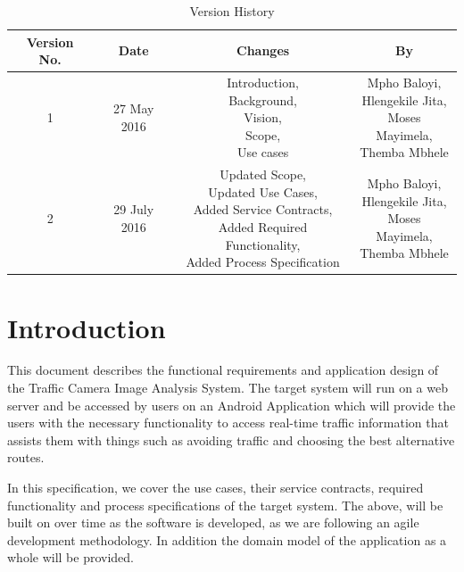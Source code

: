 \documentclass[a4paper,12pt]{article}
\begin{document}
\newpage
\tableofcontents
\newpage

\newpage
\begin{table}[ht]
 \centering
 \caption{Version History}
 \label{tab:table1}
 \begin{tabular}{cccc}
   \toprule Version No. & Date & Changes & By\\
   \midrule 1 & 27 May 2016 & \makecell {Introduction,\\ Background,\\ Vision,\\ Scope,\\ Use cases} & \makecell {Mpho Baloyi,\\ Hlengekile Jita,\\ Moses Mayimela,\\ Themba Mbhele}\\
   2 & 29 July 2016 & \makecell {Updated Scope,\\ Updated Use Cases,\\ Added Service Contracts,\\ Added Required Functionality,\\ Added Process Specification} & \makecell {Mpho Baloyi,\\ Hlengekile Jita,\\ Moses Mayimela,\\ Themba Mbhele} \\
   \bottomrule
  \end{tabular}
\end{table}
\newpage

\section{Introduction}
This document describes the functional requirements and application design of the Traffic Camera Image Analysis System. The target system will run on a web server  and be accessed by users on an Android Application which will provide the users with the necessary functionality to access real-time traffic information that assists them with things such as avoiding traffic and choosing the best alternative routes. 

In this specification, we cover the use cases, their service contracts, required functionality and process specifications of the target system. The above, will be built on over time as the software is developed, as we are following an agile development methodology. In addition the domain model of the application as a whole will be provided.
\end{document}
